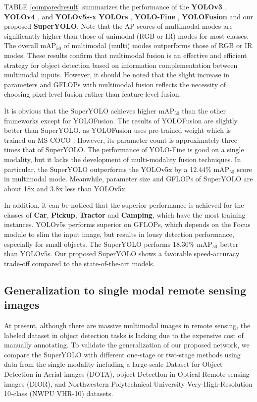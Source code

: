 TABLE \ref{comparedresult} summarizes the performance of the \textbf{YOLOv3 \cite{redmon2018yolov3}}, \textbf{YOLOv4  \cite{bochkovskiy2020yolov4}}, and \textbf{YOLOv5s-x} \cite{yolov5} \textbf{YOLOrs } \cite{9273212}, \textbf{YOLO-Fine} \cite{pham2020yolo}, \textbf{YOLOFusion} \cite{qingyun2022cross} and our proposed \textbf{SuperYOLO}. Note that the AP scores of multimodal modes are significantly higher than those of unimodal (RGB or IR) modes for most classes. The overall $\text{mA}{{\text{P}}_{\text{50}}}$ of multimodal (multi) modes outperforms those of RGB or IR modes. These results confirm that multimodal fusion is an effective and efficient strategy for object detection based on information complementation between multimodal inputs. However, it should be noted that the slight increase in parameters and GFLOPs with multimodal fusion reflects the necessity of choosing pixel-level fusion rather than feature-level fusion.

It is obvious that the SuperYOLO achieves higher $\text{mA}{{\text{P}}_{\text{50}}}$ than the other frameworks except for YOLOFusion. The results of YOLOFusion are slightly better than SuperYOLO, as YOLOFusion uses pre-trained weight which is trained on MS COCO \cite{lin2014microsoft}. However, its parameter count is approximately three times that of SuperYOLO. The performance of YOLO-Fine is good on a single modality, but it lacks the development of multi-modality fusion techniques. In particular, the SuperYOLO outperforms the YOLOv5x by a 12.44\% $\text{mA}{{\text{P}}_{\text{50}}}$ score in multimodal mode. Meanwhile, parameter size and GFLOPs of SuperYOLO are about 18x and 3.8x less than YOLOv5x. 

In addition, it can be noticed that the superior performance is achieved for the classes of \textbf{Car}, \textbf{Pickup}, \textbf{Tractor} and \textbf{Camping}, which have the most training instances. YOLOv5s performs superior on GFLOPs, which depends on the Focus module to slim the input image, but results in lousy detection performance, especially for small objects. The SuperYOLO performs 18.30\% $\text{mA}{{\text{P}}_{\text{50}}}$ better than YOLOv5s. Our proposed SuperYOLO shows a favorable speed-accuracy trade-off compared to the state-of-the-art models.








\subsection{Generalization to single modal remote sensing images}
At present, although there are massive multimodal images in remote sensing, the labeled dataset in object detection tasks is lacking due to the expensive cost of manually annotating. To validate the generalization of our proposed network, we compare the SuperYOLO with different one-stage or two-stage methods using data from the single modality including a large-scale Dataset for Object Detection in Aerial images (DOTA), object DetectIon in Optical Remote sensing images (DIOR), and Northwestern Polytechnical University Very-High-Resolution 10-class (NWPU VHR-10) datasets.

